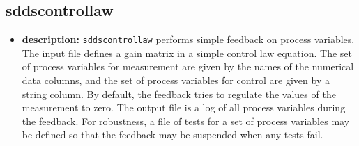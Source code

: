 %
%
\begin{latexonly}
\newpage
\end{latexonly}

%
%
\subsection{sddscontrollaw}
\label{sddscontrollaw}

\begin{itemize}
\item {\bf description:}
%
%
\verb+sddscontrollaw+ performs simple feedback on process variables.
The input file defines a gain matrix in a simple control law equation. The set of process variables for
measurement are given by the names of the numerical data columns, and the set
of process variables for control are given by a string column. By default,
the feedback tries to regulate the values of the measurement to zero.
The output file is a log of all process variables during the feedback.
For robustness, a file of tests for a set of process variables may be defined 
so that the feedback may be suspended when any tests fail.


\end{itemize}
